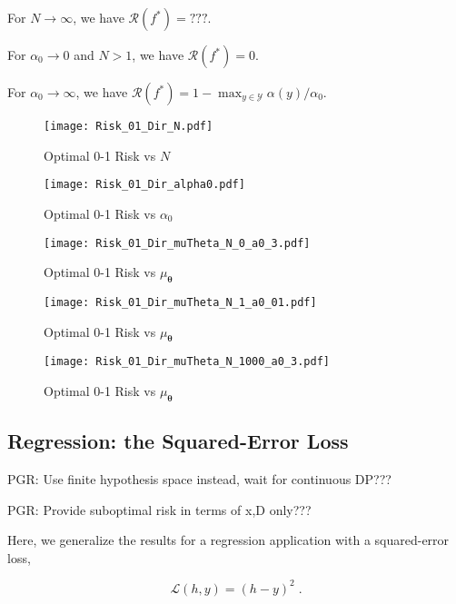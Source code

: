 \documentclass[12pt]{report}
\begin{document}
For $N \longrightarrow \infty$, we have $\mathcal{R}(f^*) = ???$.

For $\alpha_0 \longrightarrow 0$ and $N > 1$, we have $\mathcal{R}(f^*) = 0$.

For $\alpha_0 \longrightarrow \infty$, we have $\mathcal{R}(f^*) = 1 - \max_{y \in \mathcal{Y}} \alpha(y) / \alpha_0$.



\begin{figure}
\centering
\texttt{[image: Risk\_01\_Dir\_N.pdf]}
\caption{Optimal 0-1 Risk vs $N$}
\label{fig:Risk_01_Dir_N}
\end{figure}

\begin{figure}
\centering
\texttt{[image: Risk\_01\_Dir\_alpha0.pdf]}
\caption{Optimal 0-1 Risk vs $\alpha_0$}
\label{fig:Risk_01_Dir_alpha0}
\end{figure}

\begin{figure}
\centering
\texttt{[image: Risk\_01\_Dir\_muTheta\_N\_0\_a0\_3.pdf]}
\caption{Optimal 0-1 Risk vs $\mu_{\bm{\theta}}$}
\label{fig:Risk_01_Dir_muTheta_N_0_a0_3}
\end{figure}

\begin{figure}
\centering
\texttt{[image: Risk\_01\_Dir\_muTheta\_N\_1\_a0\_01.pdf]}
\caption{Optimal 0-1 Risk vs $\mu_{\bm{\theta}}$}
\label{fig:Risk_01_Dir_muTheta_N_1_a0_01}
\end{figure}

\begin{figure}
\centering
\texttt{[image: Risk\_01\_Dir\_muTheta\_N\_1000\_a0\_3.pdf]}
\caption{Optimal 0-1 Risk vs $\mu_{\bm{\theta}}$}
\label{fig:Risk_01_Dir_muTheta_N_1000_a0_3}
\end{figure}





\subsection{Regression: the Squared-Error Loss}

PGR: Use finite hypothesis space instead, wait for continuous DP???

PGR: Provide suboptimal risk in terms of x,D only???


Here, we generalize the results for a regression application with a squared-error loss,

\begin{equation}
\mathcal{L}(h,y) = (h-y)^2 \;.
\end{equation}
\end{document}
